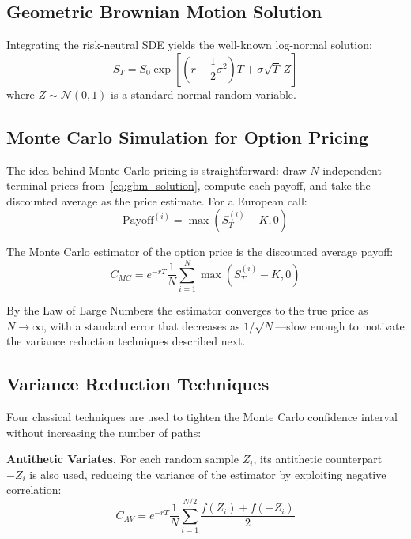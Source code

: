 \documentclass[conference]{IEEEtran}
\begin{document}
\subsection{Geometric Brownian Motion Solution}

Integrating the risk-neutral SDE yields the well-known log-normal solution:
\begin{equation}\label{eq:gbm_solution}
    S_T = S_0 \exp\left[\left(r - \frac{1}{2}\sigma^2\right)T + \sigma\sqrt{T}\,Z\right]
\end{equation}
where $Z \sim \mathcal{N}(0,1)$ is a standard normal random variable.

\subsection{Monte Carlo Simulation for Option Pricing}

The idea behind Monte Carlo pricing is straightforward: draw $N$ independent terminal prices from~\eqref{eq:gbm_solution}, compute each payoff, and take the discounted average as the price estimate. For a European call:
\begin{equation}
    \text{Payoff}^{(i)} = \max\left(S_T^{(i)} - K, 0\right)
\end{equation}

The Monte Carlo estimator of the option price is the discounted average payoff:
\begin{equation}\label{eq:mc_estimator}
    C_{MC} = e^{-rT} \frac{1}{N} \sum_{i=1}^{N} \max\left(S_T^{(i)} - K, 0\right)
\end{equation}

By the Law of Large Numbers the estimator converges to the true price as $N \to \infty$, with a standard error that decreases as $1/\sqrt{N}$---slow enough to motivate the variance reduction techniques described next.

\subsection{Variance Reduction Techniques}

Four classical techniques are used to tighten the Monte Carlo confidence interval without increasing the number of paths:

\textbf{Antithetic Variates.} For each random sample $Z_i$, its antithetic counterpart $-Z_i$ is also used, reducing the variance of the estimator by exploiting negative correlation:
\begin{equation}
    C_{AV} = e^{-rT} \frac{1}{N} \sum_{i=1}^{N/2} \frac{f(Z_i) + f(-Z_i)}{2}
\end{equation}
\end{document}
